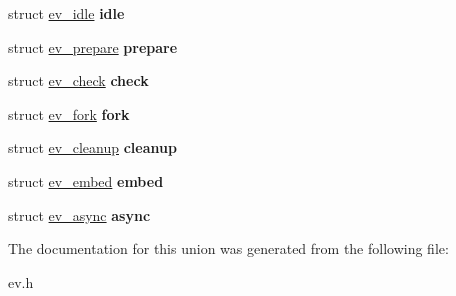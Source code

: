 \begin{DoxyCompactItemize}
\item 
\hypertarget{unionev__any__watcher_a981b4fb4bb0c57edde815eb5c653ab21}{}\label{unionev__any__watcher_a981b4fb4bb0c57edde815eb5c653ab21} 
struct \hyperlink{structev__idle}{ev\+\_\+idle} {\bfseries idle}
\item 
\hypertarget{unionev__any__watcher_ab8e9044b76b083a745fe88887035c5b7}{}\label{unionev__any__watcher_ab8e9044b76b083a745fe88887035c5b7} 
struct \hyperlink{structev__prepare}{ev\+\_\+prepare} {\bfseries prepare}
\item 
\hypertarget{unionev__any__watcher_a11934d4f1f244f75b706db27abfea16e}{}\label{unionev__any__watcher_a11934d4f1f244f75b706db27abfea16e} 
struct \hyperlink{structev__check}{ev\+\_\+check} {\bfseries check}
\item 
\hypertarget{unionev__any__watcher_a63e589011bdf5d405a87b0b452d0aa18}{}\label{unionev__any__watcher_a63e589011bdf5d405a87b0b452d0aa18} 
struct \hyperlink{structev__fork}{ev\+\_\+fork} {\bfseries fork}
\item 
\hypertarget{unionev__any__watcher_acf48afbff0708cefa05cfdb2a3f89c52}{}\label{unionev__any__watcher_acf48afbff0708cefa05cfdb2a3f89c52} 
struct \hyperlink{structev__cleanup}{ev\+\_\+cleanup} {\bfseries cleanup}
\item 
\hypertarget{unionev__any__watcher_adecc46ee7ea240767431d1247109ae87}{}\label{unionev__any__watcher_adecc46ee7ea240767431d1247109ae87} 
struct \hyperlink{structev__embed}{ev\+\_\+embed} {\bfseries embed}
\item 
\hypertarget{unionev__any__watcher_ad0452986b798bbf59f852b3e4d164cfe}{}\label{unionev__any__watcher_ad0452986b798bbf59f852b3e4d164cfe} 
struct \hyperlink{structev__async}{ev\+\_\+async} {\bfseries async}
\end{DoxyCompactItemize}


The documentation for this union was generated from the following file\+:\begin{DoxyCompactItemize}
\item 
ev.\+h\end{DoxyCompactItemize}

